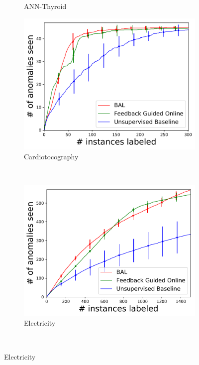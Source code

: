 \documentclass{article} %
\begin{document}
\begin{figure}[h]
\begin{subfigure}[b]{0.23\textwidth}
		\caption{ANN-Thyroid}
		\label{fig:angles_ann_thyroid_1v3}
	\end{subfigure}
	\begin{subfigure}[b]{0.23\textwidth}
		\includegraphics[width=\textwidth]{fbonline/num_seen-cardiotocography_1.pdf}%
		\caption{Cardiotocography}
		\label{fig:angles_cardiotocography}
	\end{subfigure}
	~
	\begin{subfigure}[b]{0.23\textwidth}
		\includegraphics[width=\textwidth]{fbonline/num_seen-electricity.pdf}
		\caption{Electricity}
		\label{fig:angles_electricity}
	\end{subfigure} \\

\end{figure}
\end{document}
